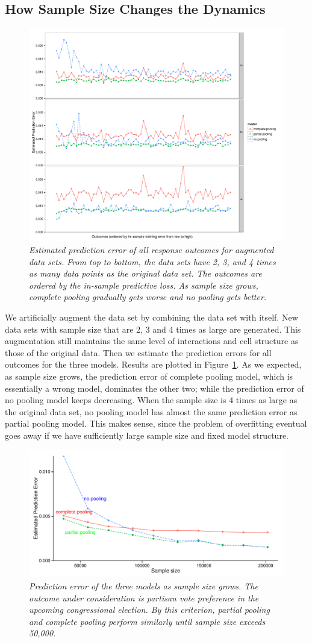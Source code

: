 \documentclass[sii]{ipart}
\begin{document}
\subsection{How Sample Size Changes the Dynamics}
\begin{figure}[p]
  \centering
  \includegraphics[width=.45\textwidth]{outcome234.pdf}
  \caption{\em Estimated prediction error of all response outcomes for augmented
    data sets. From top to bottom, the data sets have 2, 3, and 4 times as many
    data points as the original data set. The outcomes are ordered by the
    in-sample predictive loss. As sample size grows, complete pooling
    gradually gets worse and no pooling gets better.}
  \label{fig:figx234}
\end{figure} 
We artificially augment the data set by combining the data set with itself. New
data sets with sample size that are 2, 3 and 4 times as large are generated.
This augmentation still maintains the same level of interactions and cell
structure as those of the original data. Then we estimate the prediction errors
for all outcomes for the three models. Results are plotted in
Figure~\ref{fig:figx234}. As we expected, as sample size grows, the prediction
error of complete pooling model, which is essentially a wrong model, dominates
the other two; while the prediction error of no pooling model keeps
decreasing. When the sample size is 4 times as large as the original data set, no
pooling model has almost the same prediction error as partial pooling model. This
makes sense, since the problem of overfitting eventual goes away if we have
sufficiently large sample size and fixed model structure.
\begin{figure}
  \centering
  \includegraphics[width=.85\textwidth]{hourvote.pdf}
  \caption{\em Prediction error of the three models as sample size grows. The
    outcome under consideration is partisan vote preference in the upcoming
    congressional election. By this criterion, partial pooling and complete
    pooling perform similarly until sample size exceeds 50,000.}
  \label{fig:hourvote}
\end{figure}
\end{document}
